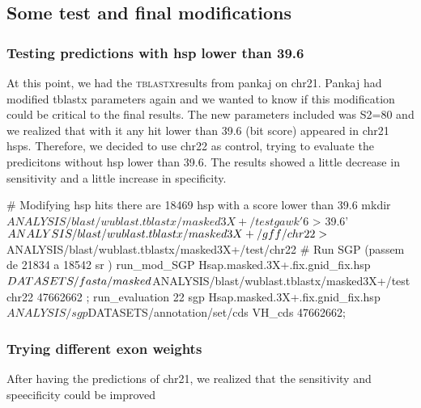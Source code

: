 \documentclass[11pt]{article}
\def\nwendcode{\endtrivlist \endgroup} %
\let\nwdocspar=\par                    %
\newcommand{\subsctn}[1]{\subsection{#1}}
\newcommand{\subsubsctn}[1]{\subsubsection{#1}}
\def\tbx{\textsc{tblastx}}
\begin{document}
\nwendcode{}\nwdocspar

\subsctn{Some test and final modifications}
\subsubsctn{Testing predictions with hsp lower than 39.6}
At this point, we had the \tbx results from pankaj on chr21. Pankaj had modified tblastx parameters again and we wanted to know if this modification could be critical to the final results. The new parameters included was S2=80 and we realized that with it any hit lower than 39.6 (bit score) appeared in chr21 hsps. Therefore, we decided to use chr22 as control, trying to evaluate the predicitons without  hsp lower than 39.6. The results showed a little decrease in sensitivity and a little increase in specificity.                                           

\nwenddocs{}\endmoddef
# Modifying hsp hits there are 18469 hsp with a score lower than 39.6
mkdir $ANALYSIS/blast/wublast.tblastx/masked3X+/test
gawk '$6 > 39.6' $ANALYSIS/blast/wublast.tblastx/masked3X+/gff/chr22 \\
        >  $ANALYSIS/blast/wublast.tblastx/masked3X+/test/chr22
# Run SGP (passem de 21834 a 18542 sr )
run_mod_SGP Hsap.masked.3X+.fix.gnid_fix.hsp $DATASETS/fasta/masked \\
        $ANALYSIS/blast/wublast.tblastx/masked3X+/test chr22 47662662 ;
run_evaluation 22 sgp Hsap.masked.3X+.fix.gnid_fix.hsp $ANALYSIS/sgp $DATASETS/annotation/set/cds VH_cds 47662662;
\nwendcode{}\nwdocspar

\subsubsctn{Trying different exon weights}
After having the predictions of chr21, we realized that the sensitivity and speecificity could be improved
\end{document}
